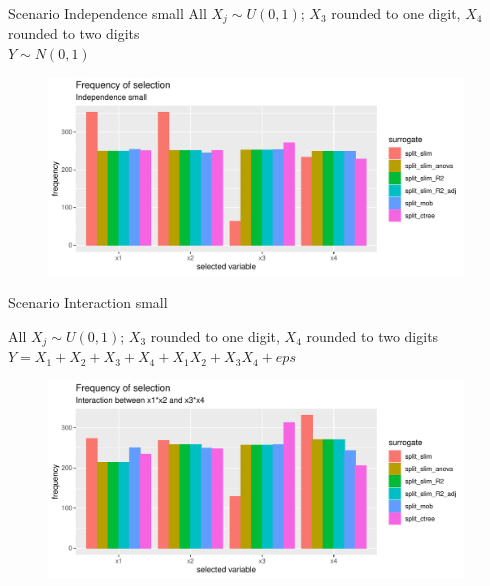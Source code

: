 \documentclass[9pt, xcolor=table]{beamer}
\begin{document}
\begin{frame}{Scenario Independence small}
All $X_j \sim U(0,1)$; $X_3$ rounded to one digit, $X_4$ rounded to two digits\\
$Y \sim N(0,1)$
\begin{figure}
    \includegraphics[width=11cm]{Figures/Selection_Bias/independence_small_frequency.pdf}
\end{figure}

\end{frame}

\begin{frame}{Scenario Interaction small}

All $X_j \sim U(0,1)$; $X_3$ rounded to one digit, $X_4$ rounded to two digits\\
$Y = X_1 + X_2 + X_3 + X_4 + X_1 X_2 + X_3 X_4 + eps$
\begin{figure}
    \includegraphics[width=11cm]{Figures/Selection_Bias/interaction_frequency.pdf}
\end{figure}

\end{frame}
\end{document}
